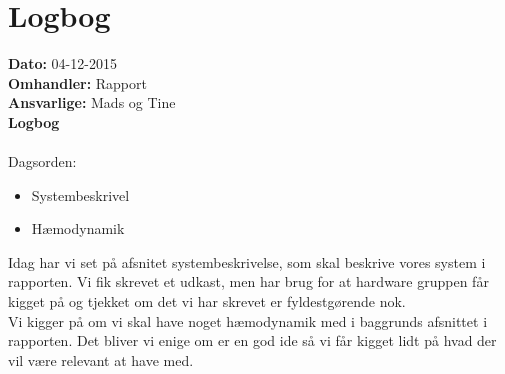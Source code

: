 \section{Logbog}

\textbf{Dato:} 04-12-2015\\
\textbf{Omhandler:} Rapport\\
\textbf{Ansvarlige:} Mads og Tine\\
\textbf{Logbog}
\\
\\
Dagsorden:
\begin{itemize}
	\item Systembeskrivel
	\item Hæmodynamik
\end{itemize}
Idag har vi set på afsnitet systembeskrivelse, som skal beskrive vores system i rapporten. Vi fik skrevet et udkast, men har brug for at hardware gruppen får kigget på og tjekket om det vi har skrevet er fyldestgørende nok.\\
Vi kigger på om vi skal have noget hæmodynamik med i baggrunds afsnittet i rapporten. Det bliver vi enige om er en god ide så vi får kigget lidt på hvad der vil være relevant at have med. 